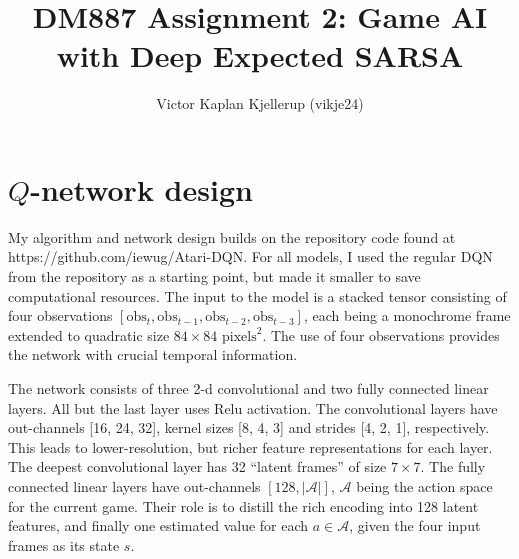 \documentclass{article}
\begin{document}
\title{DM887 Assignment 2: Game AI with Deep Expected SARSA}
\author{Victor Kaplan Kjellerup (vikje24)}
\date{}  %
\maketitle




\section{\(Q\)-network design}
My algorithm and network design builds on the repository code found at https://github.com/iewug/Atari-DQN. For all models, I used the regular DQN from the repository as a starting point, but made it smaller to save computational resources. The input to the model is a stacked tensor consisting of four observations \([\text{obs}_t, \text{obs}_{t-1}, \text{obs}_{t-2}, \text{obs}_{t-3}]\), each being a monochrome frame extended to quadratic size \(84 \times 84\) \(\text{pixels}^2\). The use of four observations provides the network with crucial temporal information.

The network consists of three 2-d convolutional and two fully connected linear layers. All but the last layer uses Relu activation. The convolutional layers have out-channels [16, 24, 32], kernel sizes [8, 4, 3] and strides [4, 2, 1], respectively. This leads to lower-resolution, but richer feature representations for each layer. The deepest convolutional layer has 32 ``latent frames'' of size \(7 \times 7\). The fully connected linear layers have out-channels \([128, |\mathcal{A}|]\), \(\mathcal{A}\) being the action space for the current game. Their role is to distill the rich encoding into 128 latent features, and finally one estimated value for each \(a \in \mathcal{A}\), given the four input frames as its state \(s\).
\end{document}
